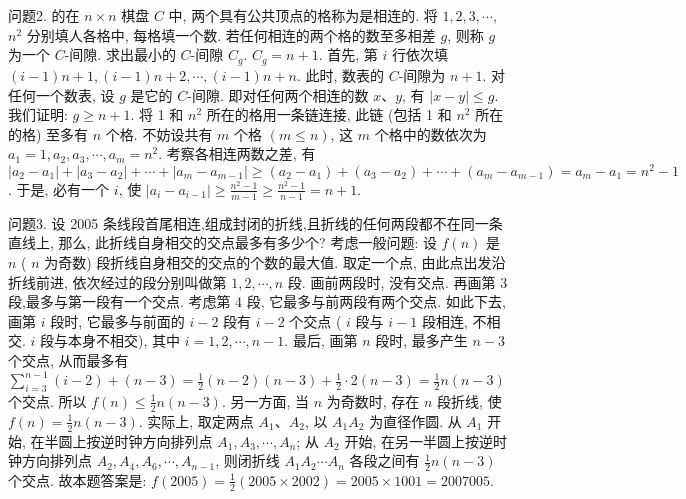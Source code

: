 问题2. 的在 $n \times n$ 棋盘 $C$ 中, 两个具有公共顶点的格称为是相连的.
将 $1,2,3, \cdots$, $n^2$ 分别填人各格中, 每格填一个数.
若任何相连的两个格的数至多相差 $g$, 则称 $g$ 为一个 $C$-间隙.
求出最小的 $C$-间隙 $C_g$.
$C_{\dot{g}}=n+1$. 首先, 第 $i$ 行依次填 $(i-1) n+1,(i-1) n+2, \cdots,(i-1) n+ n$. 此时, 数表的 $C$-间隙为 $n+1$. 对任何一个数表, 设 $g$ 是它的 $C$-间隙.
即对任何两个相连的数 $x 、 y$, 有 $|x-y| \leqslant g$. 我们证明: $g \geqslant n+1$. 将 1 和 $n^2$ 所在的格用一条链连接, 此链 (包括 1 和 $n^2$ 所在的格) 至多有 $n$ 个格.
不妨设共有 $m$ 个格 $(m \leqslant n)$, 这 $m$ 个格中的数依次为 $a_1=1, a_2, a_3, \cdots, a_m=n^2$. 考察各相连两数之差, 有 $\left|a_2-a_1\right|+\left|a_3-a_2\right|+\cdots+\left|a_m-a_{m-1}\right| \geqslant\left(a_2-a_1\right)+ \left(a_3-a_2\right)+\cdots+\left(a_m-a_{m-1}\right)=a_m-a_1=n^2-1$. 于是, 必有一个 $i$, 使 $\mid a_i- a_{i-1} \mid \geqslant \frac{n^2-1}{m-1} \geqslant \frac{n^2-1}{n-1}=n+1$.



问题3. 设 2005 条线段首尾相连,组成封闭的折线,且折线的任何两段都不在同一条直线上, 那么, 此折线自身相交的交点最多有多少个?
考虑一般问题: 设 $f(n)$ 是 $n$ ( $n$ 为奇数) 段折线自身相交的交点的个数的最大值.
取定一个点, 由此点出发沿折线前进, 依次经过的段分别叫做第 $1,2, \cdots, n$ 段.
画前两段时, 没有交点.
再画第 3 段,最多与第一段有一个交点.
考虑第 4 段, 它最多与前两段有两个交点.
如此下去, 画第 $i$ 段时, 它最多与前面的 $i-2$ 段有 $i-2$ 个交点 ( $i$ 段与 $i-1$ 段相连, 不相交.
$i$ 段与本身不相交), 其中 $i=1,2, \cdots, n-1$. 最后, 画第 $n$ 段时, 最多产生 $n-3$ 个交点, 从而最多有 $\sum_{i=3}^{n-1}(i-2)+(n-3)=\frac{1}{2}(n-2)(n-3)+\frac{1}{2} \cdot 2(n-3)=\frac{1}{2} n(n-3)$ 个交点.
所以 $f(n) \leqslant \frac{1}{2} n(n-3)$. 另一方面, 当 $n$ 为奇数时, 存在 $n$ 段折线, 使 $f(n)=\frac{1}{2} n(n-3)$. 实际上, 取定两点 $A_1 、 A_2$, 以 $A_1 A_2$ 为直径作圆.
从 $A_1$ 开始, 在半圆上按逆时钟方向排列点 $A_1, A_3, \cdots, A_n$; 从 $A_2$ 开始, 在另一半圆上按逆时钟方向排列点 $A_2, A_4, A_6, \cdots, A_{n-1}$, 则闭折线 $A_1 A_2 \cdots A_n$ 各段之间有 $\frac{1}{2} n(n-3)$ 个交点.
故本题答案是: $f(2005)=\frac{1}{2}(2005 \times 2002)= 2005 \times 1001=2007005$.



